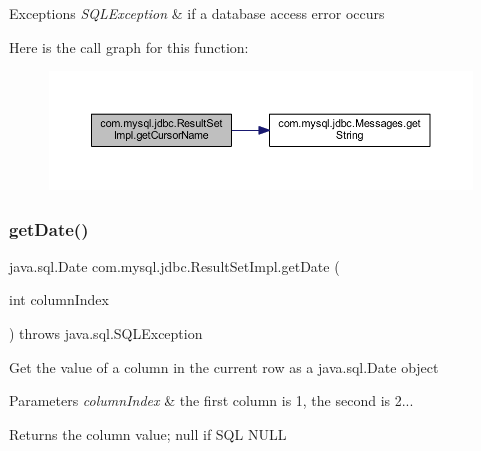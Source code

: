 \begin{DoxyExceptions}{Exceptions}
{\em S\+Q\+L\+Exception} & if a database access error occurs \\
\hline
\end{DoxyExceptions}
Here is the call graph for this function\+:
\nopagebreak
\begin{figure}[H]
\begin{center}
\leavevmode
\includegraphics[width=350pt]{classcom_1_1mysql_1_1jdbc_1_1_result_set_impl_a89ff94442cf6ac6f5b9cc9fc1be1d8ed_cgraph}
\end{center}
\end{figure}
\mbox{\label{classcom_1_1mysql_1_1jdbc_1_1_result_set_impl_a2ca574ddd1dfa28378d0aa9a85cb6b62}} 
\subsubsection{\texorpdfstring{get\+Date()}{getDate()}\hspace{0.1cm}{\footnotesize\ttfamily [1/4]}}
{\footnotesize\ttfamily java.\+sql.\+Date com.\+mysql.\+jdbc.\+Result\+Set\+Impl.\+get\+Date (\begin{DoxyParamCaption}\item[{int}]{column\+Index }\end{DoxyParamCaption}) throws java.\+sql.\+S\+Q\+L\+Exception}

Get the value of a column in the current row as a java.\+sql.\+Date object


\begin{DoxyParams}{Parameters}
{\em column\+Index} & the first column is 1, the second is 2...\\
\hline
\end{DoxyParams}
\begin{DoxyReturn}{Returns}
the column value; null if S\+QL N\+U\+LL
\end{DoxyReturn}

